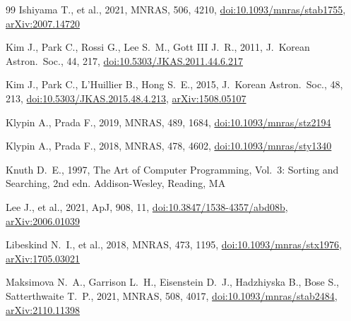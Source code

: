 \documentclass[fleqn,usenatbib]{mnras}
\begin{document}
\begin{thebibliography}{99}
Ishiyama T., et al., 2021, MNRAS, 506, 4210,
\href{https://doi.org/10.1093/mnras/stab1755}{doi:10.1093/mnras/stab1755},
\href{https://arxiv.org/abs/2007.14720}{arXiv:2007.14720}

Kim J., Park C., Rossi G., Lee S.~M., Gott III J.~R., 2011, J.\ Korean Astron.\ Soc., 44, 217,
\href{https://doi.org/10.5303/JKAS.2011.44.6.217}{doi:10.5303/JKAS.2011.44.6.217}

Kim J., Park C., L'Huillier B., Hong S.~E., 2015, J.\ Korean Astron.\ Soc., 48, 213,
\href{https://doi.org/10.5303/JKAS.2015.48.4.213}{doi:10.5303/JKAS.2015.48.4.213},
\href{https://arxiv.org/abs/1508.05107}{arXiv:1508.05107}

Klypin A., Prada F., 2019, MNRAS, 489, 1684,
\href{https://doi.org/10.1093/mnras/stz2217}{doi:10.1093/mnras/stz2194}

Klypin A., Prada F., 2018, MNRAS, 478, 4602,
\href{https://doi.org/10.1093/mnras/sty1340}{doi:10.1093/mnras/sty1340}


Knuth D.~E., 1997, The Art of Computer Programming, Vol.~3:
Sorting and Searching, 2nd edn. Addison-Wesley, Reading, MA

Lee J., et al., 2021, ApJ, 908, 11,
\href{https://doi.org/10.3847/1538-4357/abd08b}{doi:10.3847/1538-4357/abd08b},
\href{https://arxiv.org/abs/2006.01039}{arXiv:2006.01039}

Libeskind N.~I., et al., 2018, MNRAS, 473, 1195,
\href{https://doi.org/10.1093/mnras/stx1976}{doi:10.1093/mnras/stx1976},
\href{https://arxiv.org/abs/1705.03021}{arXiv:1705.03021}

Maksimova N.~A., Garrison L.~H., Eisenstein D.~J., Hadzhiyska B., Bose S., Satterthwaite T.~P., 2021, MNRAS, 508, 4017,
\href{https://doi.org/10.1093/mnras/stab2484}{doi:10.1093/mnras/stab2484},
\href{https://arxiv.org/abs/2110.11398}{arXiv:2110.11398}


\end{thebibliography}
\end{document}
